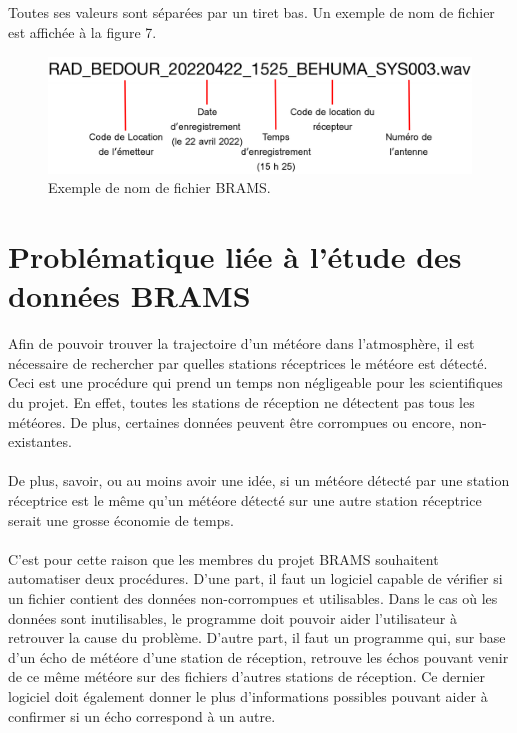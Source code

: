 \documentclass[11pt]{article}
\begin{document}
Toutes ses valeurs sont séparées par un tiret bas.
Un exemple de nom de fichier est affichée à la figure 7.

\begin{figure}[t]
    \begin{center}
        \includegraphics[scale=0.15]{file_name.png}
        \caption{Exemple de nom de fichier BRAMS.}
    \end{center}
\end{figure}

\newpage

\section{Problématique liée à l'étude des données BRAMS}

Afin de pouvoir trouver la trajectoire d'un météore dans l'atmosphère, il est nécessaire de rechercher par quelles stations réceptrices le météore est détecté.
Ceci est une procédure qui prend un temps non négligeable pour les scientifiques du projet.
En effet, toutes les stations de réception ne détectent pas tous les météores.
De plus, certaines données peuvent être corrompues ou encore, non-existantes.\\
\\
De plus, savoir, ou au moins avoir une idée, si un météore détecté par une station réceptrice est le même qu'un météore détecté sur une autre station réceptrice serait une grosse économie de temps.\\
\\
C'est pour cette raison que les membres du projet BRAMS souhaitent automatiser deux procédures.
D'une part, il faut un logiciel capable de vérifier si un fichier contient des données non-corrompues et utilisables.
Dans le cas où les données sont inutilisables, le programme doit pouvoir aider l'utilisateur à retrouver la cause du problème.
D'autre part, il faut un programme qui, sur base d'un écho de météore d'une station de réception, retrouve les échos pouvant venir de ce même météore sur des fichiers d'autres stations de réception.
Ce dernier logiciel doit également donner le plus d'informations possibles pouvant aider à confirmer si un écho correspond à un autre.
\end{document}
